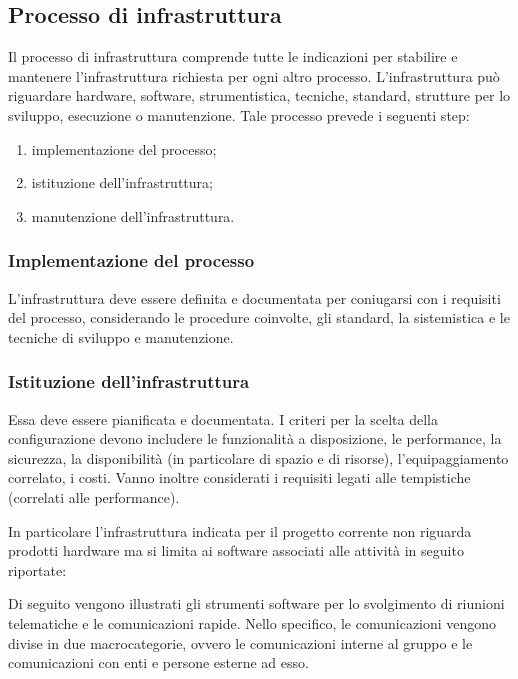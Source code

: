 \subsection{Processo di infrastruttura}
Il processo di infrastruttura comprende tutte le indicazioni per stabilire e mantenere l'infrastruttura richiesta per ogni altro processo. L'infrastruttura può riguardare hardware, software, strumentistica, tecniche, standard, strutture per lo sviluppo, esecuzione o manutenzione.
Tale processo prevede i seguenti step:

\begin{enumerate}
    \item implementazione del processo;
    \item istituzione dell'infrastruttura;
    \item manutenzione dell'infrastruttura.
\end{enumerate}

\subsubsection{Implementazione del processo}
L'infrastruttura deve essere definita e documentata per coniugarsi con i requisiti del processo, considerando le procedure coinvolte, gli standard, la sistemistica e le tecniche di sviluppo e manutenzione.

\subsubsection{Istituzione dell'infrastruttura}

Essa deve essere pianificata e documentata. I criteri per la scelta della configurazione devono includere le funzionalità a disposizione, le performance, la sicurezza, la disponibilità (in particolare di spazio e di risorse), l'equipaggiamento correlato, i costi. Vanno inoltre considerati i requisiti legati alle tempistiche (correlati alle performance).

In particolare l'infrastruttura indicata per il progetto corrente non riguarda prodotti hardware ma si limita ai software associati alle attività in seguito riportate:


Di seguito  vengono illustrati gli strumenti software per lo svolgimento di riunioni telematiche e le comunicazioni rapide. Nello specifico, le comunicazioni vengono divise in due macrocategorie, ovvero le comunicazioni interne al gruppo e le comunicazioni con enti e persone esterne ad esso.

